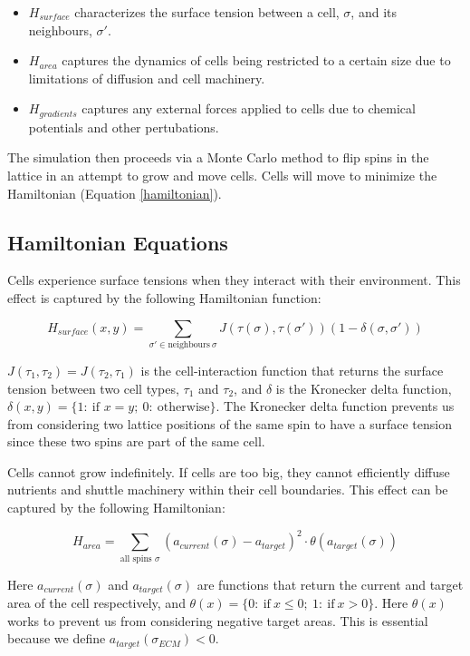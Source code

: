 \documentclass[12pt]{article}
\begin{document}
\begin{itemize}
	\item $H_{surface}$ characterizes the surface tension between a cell, $\sigma$, and its neighbours, $\sigma'$.
	\item $H_{area}$ captures the dynamics of cells being restricted to a certain size due to limitations of diffusion and cell machinery. 
	\item $H_{gradients}$ captures any external forces applied to cells due to chemical potentials and other pertubations.
\end{itemize}

The simulation then proceeds via a Monte Carlo method to flip spins in the lattice in an attempt to grow and move cells. Cells will move to minimize the Hamiltonian (Equation \ref{hamiltonian}).

\subsection{Hamiltonian Equations}
Cells experience surface tensions when they interact with their environment. This effect is captured by the following Hamiltonian function:

\begin{equation}
	H_{surface} (x,y) = \sum_{\sigma' \in \text{neighbours}~\sigma} J(\tau(\sigma), \tau(\sigma'))(1-\delta(\sigma, \sigma'))
\end{equation}

$J(\tau_1, \tau_2)=J(\tau_2, \tau_1)$ is the cell-interaction function that returns the surface tension between two cell types, $\tau_1$ and $\tau_2$, and $\delta$ is the Kronecker delta function, $\delta(x,y)=\{1:~\text{if }x=y;~0:~\text{otherwise}\}$. The Kronecker delta function prevents us from considering two lattice positions of the same spin to have a surface tension since these two spins are part of the same cell.

Cells cannot grow indefinitely. If cells are too big, they cannot efficiently diffuse nutrients and shuttle machinery within their cell boundaries. This effect can be captured by the following Hamiltonian:

\begin{equation}
	H_{area} = \sum_{\text{all spins }\sigma} (a_{current}(\sigma)-a_{target})^2 \cdot \theta(a_{target}(\sigma))
	\label{H_area}
\end{equation}

Here $a_{current}(\sigma)$ and $a_{target}(\sigma)$ are functions that return the current and target area of the cell respectively, and $\theta(x)=\{0:~\text{if}~x\leq 0;~1:~\text{if}~x>0\}$. Here $\theta(x)$ works to prevent us from considering negative target areas. This is essential because we define $a_{target}(\sigma_{ECM}) < 0$.
\end{document}
